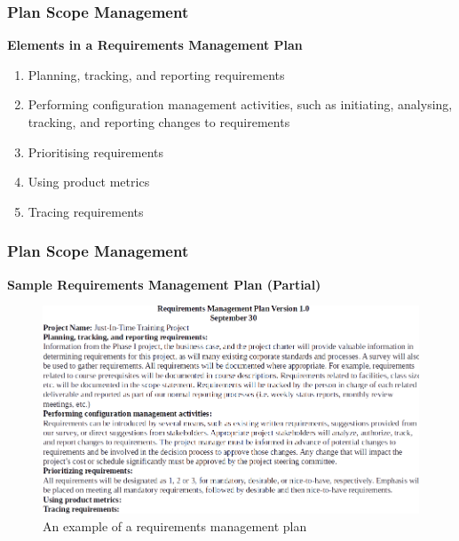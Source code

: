 \documentclass{beamer}
\begin{document}

\begin{frame}
\frametitle{Plan Scope Management}
\begin{tcolorbox}
\textbf{Elements in a Requirements Management Plan}
\begin{enumerate}
\item Planning, tracking, and reporting requirements
\item Performing configuration management activities, such as initiating, analysing, tracking, and reporting changes to requirements
\item Prioritising requirements
\item Using product metrics
\item Tracing requirements
\end{enumerate}
\end{tcolorbox}

\end{frame}


\begin{frame}
\frametitle{Plan Scope Management}
\textbf{Sample Requirements Management Plan (Partial)}
\begin{figure}
\includegraphics[scale=0.5]{req_man}
\vspace{-0.3cm}
\caption{An example of a requirements management plan}
\end{figure}
\end{frame}
\end{document}
